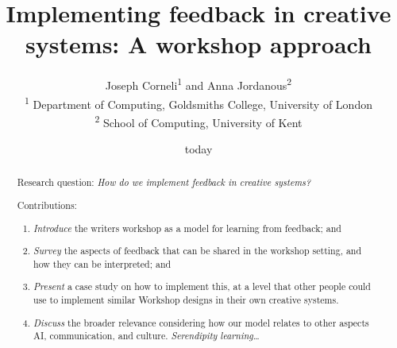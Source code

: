 \documentclass[letter]{article}
\begin{document}
\title{Implementing feedback in creative systems: A workshop approach}

\author{Joseph Corneli\textsuperscript{1} and Anna Jordanous\textsuperscript{2}\\
\textsuperscript{1} Department of Computing, Goldsmiths College, University of London\\
\textsuperscript{2} School of Computing, University of Kent}

\date{today}

\maketitle

\begin{abstract} 
\item[] Research question: \emph{How do we implement feedback in
  creative systems?}
%
\item[] Contributions:
\begin{enumerate}
\item \emph{Introduce} the writers workshop as a model for learning
  from feedback; and
%
\item \emph{Survey} the aspects of feedback that can be shared in the
  workshop setting, and how they can be interpreted; and
%
\item \emph{Present} a case study on how to implement this, at a level
  that other people could use to implement similar Workshop designs in
  their own creative systems.
%
\item \emph{Discuss} the broader relevance considering how our model
  relates to other aspects AI, communication, and culture.
  \emph{Serendipity} \emph{learning}\ldots
%

\end{enumerate}
\end{abstract}



%









\end{document}
